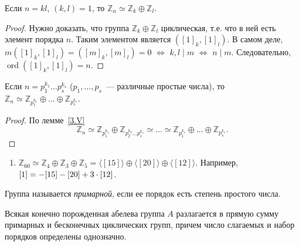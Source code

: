 \documentclass[a4paper]{article}
\newcommand{\ord}{\mathop{\mathrm{ord}}\nolimits}
\newcommand*{\p}[1]{#1\nobreak\discretionary{}{\hbox{$\mathsurround=0pt #1$}}{}}
\begin{document}
\begin{lemm}
\label{3.V}Если $n=kl$, $(k,l)=1$, то
$\mathbb{Z}_n\simeq\mathbb{Z}_k\oplus\mathbb{Z}_l$.
\end{lemm}

\begin{proof}
Нужно доказать, что группа $\mathbb{Z}_k\oplus\mathbb{Z}_l$
циклическая, т.е. что в ней есть элемент порядка $n$. Таким
элементом является $([1]_k,[1]_l)$. В самом деле,
$m([1]_k,[1]_l)=([m]_k,[m]_l)=0$ $\Leftrightarrow$ $k,l\mid m$
$\Leftrightarrow$ $n\mid m$. Следовательно, $\ord([1]_k,[1]_l)=n$.
\end{proof}

\begin{theorem}
Если $n=p_1^{k_1}\ldots p_s^{k_s}$ ($p_1,\ldots,p_s$~--- различные
простые числа), то
$\mathbb{Z}_n\simeq\mathbb{Z}_{p_1^{k_1}}\oplus\ldots\oplus\mathbb{Z}_{p_s^{k_s}}$.
\end{theorem}

\begin{proof}
По лемме~\ref{3.V}$$\mathbb{Z}_n\simeq\mathbb{Z}_{p_1^{k_1}}\oplus
\mathbb{Z}_{p_2^{k_2}\ldots
p_s^{k_s}}\simeq\ldots\simeq\mathbb{Z}_{p_1^{k_1}}\oplus \ldots
\oplus\mathbb{Z}_{p_s^{k_s}}.$$
\end{proof}

\prim
\begin{enumerate}
  \item $\mathbb{Z}_{60}\simeq \mathbb{Z}_4\oplus\mathbb{Z}_3\oplus\mathbb{Z}_5=
  \langle[15]\rangle\oplus\langle[20]\rangle\oplus\langle[12]\rangle$.
  Например, $[1]=-[15]\p-[20]+3\cdot[12]$.
\end{enumerate}

Группа называется \emph{примарной}, если ее порядок есть степень
простого числа.

\begin{theorem}
Всякая конечно порожденная абелева группа $A$ разлагается в прямую
сумму примарных и бесконечных циклических групп, причем число
слагаемых и набор порядков определены однозначно.
\end{theorem}
\end{document}
